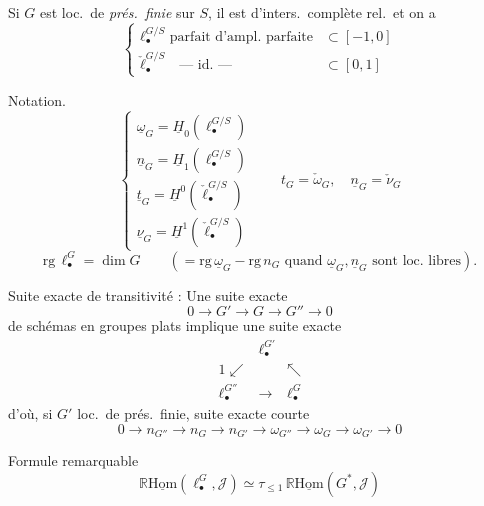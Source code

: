\documentclass[11pt,a4paper]{article}
\begin{document}
Si $G$ est loc.\ de \emph{prés.\ finie} sur $S$, il est d'inters.\ complète rel.\ et on a
\[
\left\lbrace
\begin{array}{ll}
\ell^{G/S}_{\bullet} \text{ parfait d'ampl.\ parfaite} & \subset [-1,0] \\
\check{\ell}^{G/S}_{\bullet} \quad \text{— id. —} & \subset [0,1]
\end{array}
\right.
\]

Notation.
\[
\left\lbrace
\begin{array}{l}
\underline{\omega}_G = \underline{H}_0(\ell^{G/S}_{\bullet}) \\
\underline{n}_G = \underline{H}_1(\ell^{G/S}_{\bullet}) \\
\underline{t}_G = \underline{H}^0(\check{\ell}^{G/S}_{\bullet}) \\
\underline{\nu}_G = \underline{H}^1(\check{\ell}^{G/S}_{\bullet})
\end{array}
\right.
\qquad t_G = \check{\omega}_G, \quad \underline{n}_G = \check{\nu}_G
\]
\[
\mathrm{rg}\, \ell^{G}_{\bullet} = \dim G \qquad (= \mathrm{rg}\, \underline{\omega}_G - \mathrm{rg}\, n_G \text{ quand } \underline{\omega}_G, \underline{n}_G \text{ sont loc.\ libres}).
\]

Suite exacte de transitivité : Une suite exacte
\[
0 \to G' \to G \to G'' \to 0
\]
de schémas en groupes plats implique une suite exacte
\[
\begin{array}{ccc}
 & \ell^{G'}_{\bullet} & \\
{\scriptstyle 1}\swarrow & & \nwarrow \\
\ell^{G''}_{\bullet} & \longrightarrow & \ell^{G}_{\bullet}
\end{array}
\]
d'où, si $G'$ loc.\ de prés.\ finie, suite exacte courte
\[
0 \to n_{G''} \to n_{G} \to n_{G'} \to \omega_{G''} \to \omega_{G} \to \omega_{G'} \to 0
\]

Formule remarquable
\[
\boxed{\mathbb{R}\underline{\mathrm{Hom}}(\ell^{G}_{\bullet}, \mathcal{J}) \simeq \tau_{\leq 1}\, \mathbb{R}\underline{\mathrm{Hom}}(G^{*}, \mathcal{J})}
\]
\end{document}
